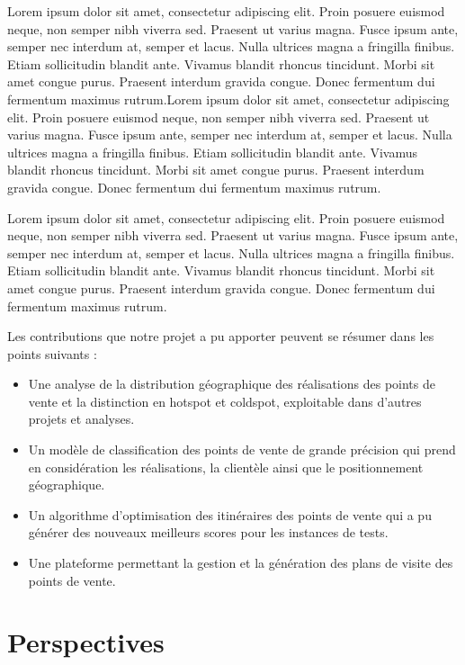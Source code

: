     Lorem ipsum dolor sit amet, consectetur adipiscing elit. Proin posuere euismod neque, non semper nibh viverra sed. Praesent ut varius magna. Fusce ipsum ante, semper nec interdum at, semper et lacus. Nulla ultrices magna a fringilla finibus. Etiam sollicitudin blandit ante. Vivamus blandit rhoncus tincidunt. Morbi sit amet congue purus. Praesent interdum gravida congue. Donec fermentum dui fermentum maximus rutrum.Lorem ipsum dolor sit amet, consectetur adipiscing elit. Proin posuere euismod neque, non semper nibh viverra sed. Praesent ut varius magna. Fusce ipsum ante, semper nec interdum at, semper et lacus. Nulla ultrices magna a fringilla finibus. Etiam sollicitudin blandit ante. Vivamus blandit rhoncus tincidunt. Morbi sit amet congue purus. Praesent interdum gravida congue. Donec fermentum dui fermentum maximus rutrum.
    
    \medskip
    
    Lorem ipsum dolor sit amet, consectetur adipiscing elit. Proin posuere euismod neque, non semper nibh viverra sed. Praesent ut varius magna. Fusce ipsum ante, semper nec interdum at, semper et lacus. Nulla ultrices magna a fringilla finibus. Etiam sollicitudin blandit ante. Vivamus blandit rhoncus tincidunt. Morbi sit amet congue purus. Praesent interdum gravida congue. Donec fermentum dui fermentum maximus rutrum.
    
    \medskip
    
    Les contributions que notre projet a pu apporter peuvent se résumer dans les points suivants :
    \medskip
    \begin{itemize}
        \item Une analyse de la distribution géographique des réalisations des points de vente et la distinction en hotspot et coldspot, exploitable dans d'autres projets et analyses.
        \item Un modèle de classification des points de vente de grande précision qui prend en considération les réalisations, la clientèle ainsi que le positionnement géographique.
        \item Un algorithme d'optimisation des itinéraires des points de vente qui a pu générer des nouveaux meilleurs scores pour les instances de tests.
        \item Une plateforme permettant la gestion et la génération des plans de visite des points de vente.
    \end{itemize}
    
    
    

\section*{Perspectives}

